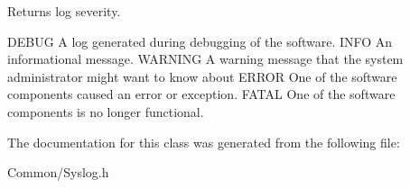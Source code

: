 Returns log severity. 

D\-E\-B\-U\-G A log generated during debugging of the software. I\-N\-F\-O An informational message. W\-A\-R\-N\-I\-N\-G A warning message that the system administrator might want to know about E\-R\-R\-O\-R One of the software components caused an error or exception. F\-A\-T\-A\-L One of the software components is no longer functional. 

The documentation for this class was generated from the following file\-:\begin{DoxyCompactItemize}
\item 
Common/Syslog.\-h\end{DoxyCompactItemize}
